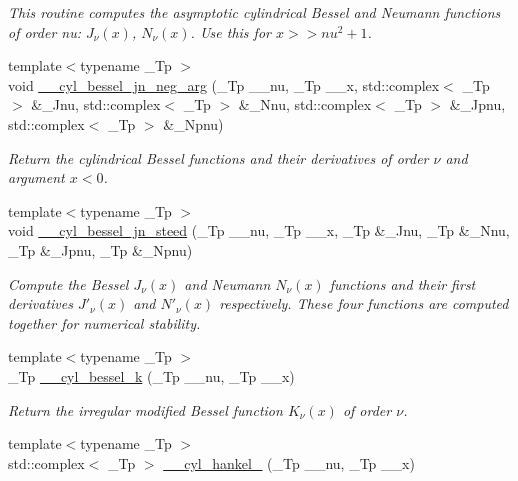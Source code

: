 \begin{DoxyCompactItemize}
\begin{DoxyCompactList}\small\item\em This routine computes the asymptotic cylindrical Bessel and Neumann functions of order nu\+: $ J_{\nu}(x) $, $ N_{\nu}(x) $. Use this for $ x >> nu^2 + 1 $. \end{DoxyCompactList}\item 
{\footnotesize template$<$typename \+\_\+\+Tp $>$ }\\void \hyperlink{namespacestd_1_1____detail_a3f85b84a09e86d02137c69b18eca5149}{\+\_\+\+\_\+cyl\+\_\+bessel\+\_\+jn\+\_\+neg\+\_\+arg} (\+\_\+\+Tp \+\_\+\+\_\+nu, \+\_\+\+Tp \+\_\+\+\_\+x, std\+::complex$<$ \+\_\+\+Tp $>$ \&\+\_\+\+Jnu, std\+::complex$<$ \+\_\+\+Tp $>$ \&\+\_\+\+Nnu, std\+::complex$<$ \+\_\+\+Tp $>$ \&\+\_\+\+Jpnu, std\+::complex$<$ \+\_\+\+Tp $>$ \&\+\_\+\+Npnu)
\begin{DoxyCompactList}\small\item\em Return the cylindrical Bessel functions and their derivatives of order $ \nu $ and argument $ x < 0 $. \end{DoxyCompactList}\item 
{\footnotesize template$<$typename \+\_\+\+Tp $>$ }\\void \hyperlink{namespacestd_1_1____detail_aec912bf99c46ec418163625de9187371}{\+\_\+\+\_\+cyl\+\_\+bessel\+\_\+jn\+\_\+steed} (\+\_\+\+Tp \+\_\+\+\_\+nu, \+\_\+\+Tp \+\_\+\+\_\+x, \+\_\+\+Tp \&\+\_\+\+Jnu, \+\_\+\+Tp \&\+\_\+\+Nnu, \+\_\+\+Tp \&\+\_\+\+Jpnu, \+\_\+\+Tp \&\+\_\+\+Npnu)
\begin{DoxyCompactList}\small\item\em Compute the Bessel $ J_\nu(x) $ and Neumann $ N_\nu(x) $ functions and their first derivatives $ J'_\nu(x) $ and $ N'_\nu(x) $ respectively. These four functions are computed together for numerical stability. \end{DoxyCompactList}\item 
{\footnotesize template$<$typename \+\_\+\+Tp $>$ }\\\+\_\+\+Tp \hyperlink{namespacestd_1_1____detail_ac9152f2369a18aa795fe24ccfa6dcf12}{\+\_\+\+\_\+cyl\+\_\+bessel\+\_\+k} (\+\_\+\+Tp \+\_\+\+\_\+nu, \+\_\+\+Tp \+\_\+\+\_\+x)
\begin{DoxyCompactList}\small\item\em Return the irregular modified Bessel function $ K_{\nu}(x) $ of order $ \nu $. \end{DoxyCompactList}\item 
{\footnotesize template$<$typename \+\_\+\+Tp $>$ }\\std\+::complex$<$ \+\_\+\+Tp $>$ \hyperlink{namespacestd_1_1____detail_aac3fc60c1210e8f2ae3cf05cdc7bad84}{\+\_\+\+\_\+cyl\+\_\+hankel\+\_} (\+\_\+\+Tp \+\_\+\+\_\+nu, \+\_\+\+Tp \+\_\+\+\_\+x)

\end{DoxyCompactItemize}
